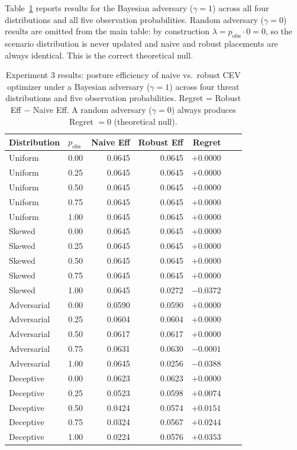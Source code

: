 \documentclass[11pt]{article}
\begin{document}
Table~\ref{tab:exp3_bayesian} reports results for the Bayesian adversary
($\gamma = 1$) across all four distributions and all five observation
probabilities.  Random adversary ($\gamma = 0$) results are omitted from
the main table: by construction $\lambda = p_\mathrm{obs} \cdot 0 = 0$,
so the scenario distribution is never updated and naive and robust
placements are always identical.  This is the correct theoretical null.

\begin{table}[htbp]
\centering
\caption{Experiment 3 results: posture efficiency of naive vs.\ robust CEV
optimizer under a Bayesian adversary ($\gamma = 1$) across four threat
distributions and five observation probabilities.
Regret = Robust Eff $-$ Naive Eff.
A random adversary ($\gamma=0$) always produces Regret $= 0$ (theoretical null).}
\label{tab:exp3_bayesian}
\begin{tabular}{llrrrrr}
\toprule
Distribution & $p_\mathrm{obs}$ & Naive Eff & Robust Eff & Regret \\
\midrule
Uniform      & 0.00 & 0.0645 & 0.0645 & $+0.0000$ \\
Uniform      & 0.25 & 0.0645 & 0.0645 & $+0.0000$ \\
Uniform      & 0.50 & 0.0645 & 0.0645 & $+0.0000$ \\
Uniform      & 0.75 & 0.0645 & 0.0645 & $+0.0000$ \\
Uniform      & 1.00 & 0.0645 & 0.0645 & $+0.0000$ \\
\midrule
Skewed       & 0.00 & 0.0645 & 0.0645 & $+0.0000$ \\
Skewed       & 0.25 & 0.0645 & 0.0645 & $+0.0000$ \\
Skewed       & 0.50 & 0.0645 & 0.0645 & $+0.0000$ \\
Skewed       & 0.75 & 0.0645 & 0.0645 & $+0.0000$ \\
Skewed       & 1.00 & 0.0645 & 0.0272 & $-0.0372$ \\
\midrule
Adversarial  & 0.00 & 0.0590 & 0.0590 & $+0.0000$ \\
Adversarial  & 0.25 & 0.0604 & 0.0604 & $+0.0000$ \\
Adversarial  & 0.50 & 0.0617 & 0.0617 & $+0.0000$ \\
Adversarial  & 0.75 & 0.0631 & 0.0630 & $-0.0001$ \\
Adversarial  & 1.00 & 0.0645 & 0.0256 & $-0.0388$ \\
\midrule
Deceptive    & 0.00 & 0.0623 & 0.0623 & $+0.0000$ \\
Deceptive    & 0.25 & 0.0523 & 0.0598 & $+0.0074$ \\
Deceptive    & 0.50 & 0.0424 & 0.0574 & $+0.0151$ \\
Deceptive    & 0.75 & 0.0324 & 0.0567 & $+0.0244$ \\
Deceptive    & 1.00 & 0.0224 & 0.0576 & $+0.0353$ \\
\bottomrule
\end{tabular}
\end{table}
\end{document}
